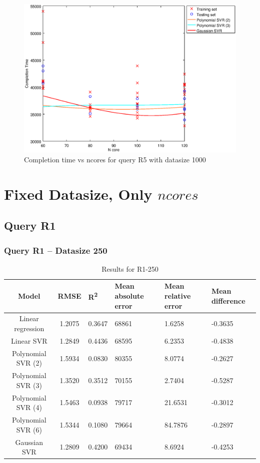 \documentclass[a4paper,11pt]{article}
\begin{document}
\begin {figure}[hbtp]
\centering
\includegraphics[width=\textwidth]{output/R5_1000_LINEAR_NCORE/plot_R5_1000_bestmodels.eps}
\caption{Completion time vs ncores for query R5 with datasize 1000}
\label{fig:all_linear_R5_1000}
\end {figure}


\newpage
\section{Fixed Datasize, Only $ncores$}
\subsection{Query R1}
\subsubsection{Query R1 -- Datasize 250}
\begin{table}[H]
	\centering
	\begin{adjustbox}{center}
		\begin{tabular}{c | c M{1.2cm} M{2.5cm} M{2.5cm} M{1.8cm}}
			Model & RMSE & R\textsuperscript{2} & Mean absolute error & Mean relative error & Mean difference \tabularnewline
			\hline
			Linear regression & 1.2075 & 0.3647 &  68861 & 1.6258 & -0.3635 \\
			Linear SVR & 1.2849 & 0.4436 &  68595 & 6.2353 & -0.4838 \\
			Polynomial SVR (2) & 1.5934 & 0.0830 &  80355 & 8.0774 & -0.2627 \\
			Polynomial SVR (3) & 1.3520 & 0.3512 &  70155 & 2.7404 & -0.5287 \\
			Polynomial SVR (4) & 1.5463 & 0.0938 &  79717 & 21.6531 & -0.3012 \\
			Polynomial SVR (6) & 1.5344 & 0.1080 &  79664 & 84.7876 & -0.2897 \\
			Gaussian SVR & 1.2809 & 0.4200 &  69434 & 8.6924 & -0.4253 \\
		\end{tabular}
	\end{adjustbox}
	\\
	\caption{Results for R1-250}
	\label{fig:coreonly_linear_R1_250}
\end{table}
\end{document}

